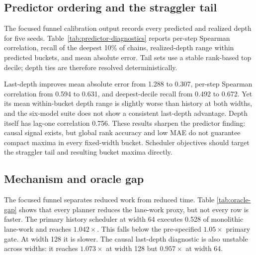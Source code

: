 \documentclass[conference]{IEEEtran}
\begin{document}
\subsection{Predictor ordering and the straggler tail}

The focused funnel calibration output records every predicted and realized
depth for five seeds.  Table~\ref{tab:predictor-diagnostics} reports per-step
Spearman correlation, recall of the deepest 10\% of chains, realized-depth range
within predicted buckets, and mean absolute error.  Tail sets use a stable
rank-based top decile; depth ties are therefore resolved deterministically.

\begin{table}[t]
\centering
\caption{Five-seed predictor diagnostics on the acceptance-calibrated focused
funnel.  Oracle-current is non-deployable.  Bucket range is the mean realized
maximum-minus-minimum depth after sorting by predicted work.}
\label{tab:predictor-diagnostics}
\small

\end{table}

Last-depth improves mean absolute error from 1.288 to 0.307, per-step Spearman
correlation from 0.594 to 0.631, and deepest-decile recall from 0.492 to 0.672.
Yet its mean within-bucket depth range is slightly worse than history at both
widths, and the six-model suite does not show a consistent last-depth advantage.
Depth itself has lag-one correlation 0.756.  These results sharpen the
predictor finding: causal signal exists, but global rank accuracy and low MAE do
not guarantee compact maxima in every fixed-width bucket.  Scheduler objectives
should target the straggler tail and resulting bucket maxima directly.

\subsection{Mechanism and oracle gap}

The focused funnel separates reduced work from reduced time.  Table
\ref{tab:oracle-gap} shows that every planner reduces the lane-work proxy, but
not every row is faster.  The primary history scheduler at width 64 executes
0.528 of monolithic lane-work and reaches $1.042\times$.  This falls below the
pre-specified $1.05\times$ primary gate.  At width 128 it is slower.  The causal
last-depth diagnostic is also unstable across widths: it reaches
$1.073\times$ at width 128 but $0.957\times$ at width 64.
\end{document}
